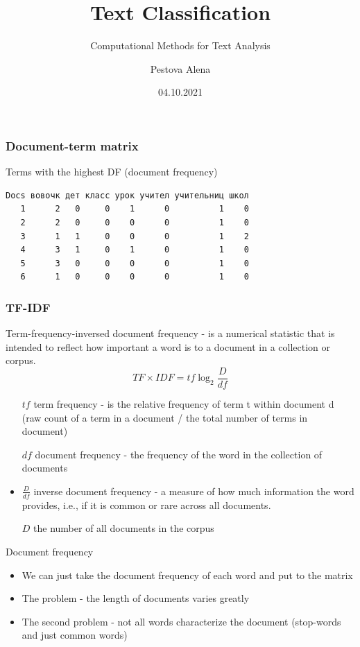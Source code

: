 \documentclass[svgnames]{beamer}
\title[CMTA 05] %
{Text Classification}
\subtitle
{Computational Methods for Text Analysis} %
\author%
{Pestova Alena}
\institute%
{HSE Saint-Petersburg}
\date%
{04.10.2021}
\begin{document}
\begin{frame}
  \titlepage
\end{frame}


\begin{frame}[fragile]
  \frametitle{Document-term matrix}
  Terms with the highest DF (document frequency)
  \footnotesize
\begin{verbatim}
Docs вовочк дет класс урок учител учительниц школ
   1      2   0     0    1      0          1    0
   2      2   0     0    0      0          1    0
   3      1   1     0    0      0          1    2
   4      3   1     0    1      0          1    0
   5      3   0     0    0      0          1    0
   6      1   0     0    0      0          1    0
\end{verbatim}
\end{frame}

\begin{frame}
  \frametitle{TF-IDF}
  Term-frequency-inversed document frequency - is a numerical statistic that is intended to reflect how important a word is to a document in a collection or corpus.
  \begin{equation}
    TF \times IDF = tf\log_2\frac{D}{df}
  \end{equation}
  \begin{itemize}
  \item[$tf$]  term frequency - is the relative frequency of term t within document d (raw count of a term in a document / the total number of terms in document)
  \item[$df$] document frequency - the frequency of the word in the collection of documents
  \item $\frac{D}{df}$ inverse document frequency - a measure of how much information the word provides, i.e., if it is common or rare across all documents.
  \item[$D$] the number of all documents in the corpus
  \end{itemize}
\end{frame}


\begin{frame}{Document frequency}
    \begin{itemize}
  \item We can just take the document frequency of each word and put to the matrix
  \item The problem - the length of documents varies greatly
  \item The second problem - not all words characterize the document (stop-words and just common words)

\end{itemize}
\end{frame}
\end{document}
